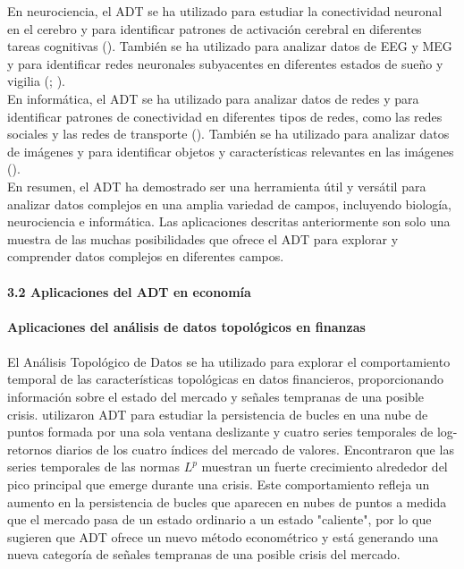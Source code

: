 En neurociencia, el ADT se ha utilizado para estudiar la conectividad neuronal en el cerebro y para identificar patrones de activación cerebral en diferentes tareas cognitivas (\cite{petri2013topological}). También se ha utilizado para analizar datos de EEG y MEG y para identificar redes neuronales subyacentes en diferentes estados de sueño y vigilia (\cite{alexander-bloch2013anatomical}; \cite{df4c47df8d5d420496874d22ea7d4381}).\\

En informática, el ADT se ha utilizado para analizar datos de redes y para identificar patrones de conectividad en diferentes tipos de redes, como las redes sociales y las redes de transporte (\cite{ghrist2014elementary}). También se ha utilizado para analizar datos de imágenes y para identificar objetos y características relevantes en las imágenes (\cite{Carlsson2009TopologyAD}).\\

En resumen, el ADT ha demostrado ser una herramienta útil y versátil para analizar datos complejos en una amplia variedad de campos, incluyendo biología, neurociencia e informática. Las aplicaciones descritas anteriormente son solo una muestra de las muchas posibilidades que ofrece el ADT para explorar y comprender datos complejos en diferentes campos.\\\\

\textbf{3.2 Aplicaciones del ADT en economía}\\\\

\textbf{Aplicaciones del análisis de datos topológicos en finanzas}\\\\

El Análisis Topológico de Datos se ha utilizado para explorar el comportamiento temporal de las características topológicas en datos financieros, proporcionando información sobre el estado del mercado y señales tempranas de una posible crisis. \cite{GIDEA2018820} utilizaron ADT para estudiar la persistencia de bucles en una nube de puntos formada por una sola ventana deslizante y cuatro series temporales de log-retornos diarios de los cuatro índices del mercado de valores. Encontraron que las series temporales de las normas $L^p$ muestran un fuerte crecimiento alrededor del pico principal que emerge durante una crisis. Este comportamiento refleja un aumento en la persistencia de bucles que aparecen en nubes de puntos a medida que el mercado pasa de un estado ordinario a un estado "caliente", por lo que \cite{GIDEA2018820} sugieren que ADT ofrece un nuevo método econométrico y está generando una nueva categoría de señales tempranas de una posible crisis del mercado.\\

